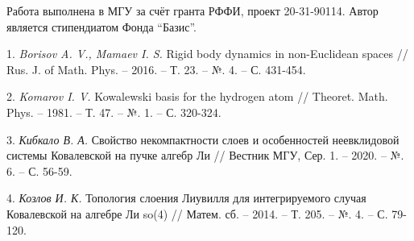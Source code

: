 \documentclass{vzmsthesis}
\begin{document}
\begin{figure}[h]
			\label{bif_diagr}
		\end{figure}



Работа выполнена в МГУ за счёт гранта РФФИ, проект 20-31-90114. Автор является стипендиатом Фонда ``Базис''.

\litlist

1. {\it Borisov A. V., Mamaev I. S.} Rigid body dynamics in non-Euclidean spaces  // Rus. J. of
Math. Phys. – 2016. – Т. 23. – №. 4. – С. 431-454.

2. {\it Komarov I. V.} Kowalewski basis for the hydrogen atom
  // Theoret. Math. Phys. – 1981. – Т. 47. – №. 1. – С. 320-324.

3. {\it Кибкало В. А.} Свойство некомпактности слоев и особенностей неевклидовой системы Ковалевской на пучке алгебр Ли  // Вестник МГУ, Сер. 1. – 2020. – №. 6. – С. 56-59.

4. {\it Козлов И. К.} Топология слоения Лиувилля для интегрируемого случая Ковалевской на алгебре Ли so(4)
  // Матем. сб. – 2014. – Т. 205. – №. 4. – С. 79-120.
\end{document}
